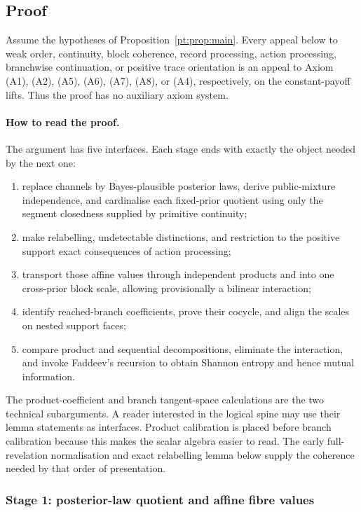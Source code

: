 \subsection{Proof}

Assume the hypotheses of Proposition~\ref{pt:prop:main}.  Every appeal below
to weak order, continuity, block coherence, record processing, action
processing, branchwise continuation, or positive trace orientation is an
appeal to Axiom \textup{(A1)}, \textup{(A2)}, \textup{(A5)}, \textup{(A6)},
\textup{(A7)}, \textup{(A8)}, or \textup{(A4)}, respectively, on the
constant-payoff lifts.  Thus the proof has no auxiliary axiom system.

\paragraph{How to read the proof.}
The argument has five interfaces.  Each stage ends with exactly the object
needed by the next one:
\begin{enumerate}[label=\textup{Stage \arabic*:},leftmargin=*]
\item replace channels by Bayes-plausible posterior laws, derive public-mixture
  independence, and cardinalise each fixed-prior quotient using only the
  segment closedness supplied by primitive continuity;
\item make relabelling, undetectable distinctions, and restriction to the
  positive support exact consequences of action processing;
\item transport those affine values through independent products and into one
  cross-prior block scale, allowing provisionally a bilinear interaction;
\item identify reached-branch coefficients, prove their cocycle, and align
  the scales on nested support faces;
\item compare product and sequential decompositions, eliminate the
  interaction, and invoke Faddeev's recursion to obtain Shannon entropy and
  hence mutual information.
\end{enumerate}
The product-coefficient and branch tangent-space calculations are the two
technical subarguments.  A reader interested in the logical spine may use
their lemma statements as interfaces.  Product calibration is
placed before branch calibration because this makes the scalar algebra easier
to read.  The early full-revelation normalisation and exact relabelling lemma
below supply the coherence needed by that order of presentation.

\subsubsection{Stage 1: posterior-law quotient and affine fibre values}

